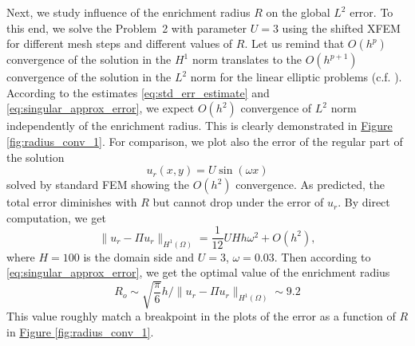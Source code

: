 \documentclass{elsarticle}
\newcommand{\prob}[1]{Problem~{#1}}
\newcommand{\fig}[1]{\hyperref[#1]{Figure \ref{#1}}}
\def\norm#1{\| #1 \|}
\begin{document}
Next, we study influence of the enrichment radius $R$ on the global $L^2$ error. To this end, we solve the \prob{2} with parameter $U=3$
using the shifted XFEM for different mesh steps and different values of $R$.
Let us remind that $O(h^p)$ convergence of the solution in the $H^1$ norm translates to the $O(h^{p+1})$ convergence of the solution in the $L^2$ norm 
for the linear elliptic problems (c.f. \cite[Theorem 19.2]{ciarlet_basic_1991}). According to the estimates \eqref{eq:std_err_estimate}
and \eqref{eq:singular_approx_error}, we expect $O(h^2)$ convergence of $L^2$ norm independently of the enrichment radius. This is 
clearly demonstrated in \fig{fig:radius_conv_1}. For comparison, we plot also the error of the regular part of the solution
\[
  u_r(x,y) = U \sin (\omega x)
\]
solved by standard FEM showing the $O(h^2)$ convergence.
As predicted, the total error diminishes with $R$ but cannot 
drop under the error of $u_r$. By direct computation, we get
\[
  \norm{u_r - \Pi u_r}_{H^1(\Omega)} = \frac{1}{12}UHh\omega^2 + O(h^2),
\]
where $H=100$ is the domain side and $U=3$, $\omega=0.03$. Then according to \eqref{eq:singular_approx_error},
we get the optimal value of the enrichment radius
\[
    R_o \sim \sqrt{\frac{\pi}{6}} h/\norm{u_r - \Pi u_r}_{H^1(\Omega)} \sim 9.2
\]
This value roughly match a breakpoint in the plots of the error as a function of $R$ in
\fig{fig:radius_conv_1}.
\end{document}
